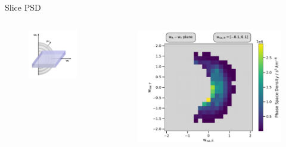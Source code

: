 \documentclass{beamer}
\begin{document}
\begin{frame}{Slice PSD}
\begin{columns}
	\column{3cm}
	\begin{figure}
		\includegraphics[scale=.7]{Pics/slice_N2.pdf}
	\end{figure}
	\column{6.5cm}
	\begin{figure}
		\includegraphics[scale=.45]{Pics/slice_psd_N.pdf}
	\end{figure}
\column{.5cm}
\end{columns}
\end{frame}



\end{document}
